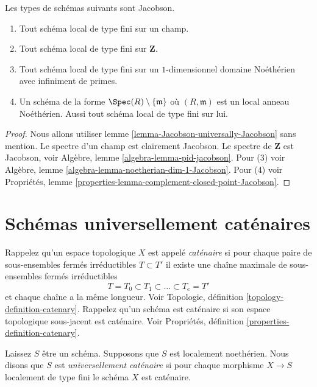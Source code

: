 \begin{lemma}

\label{lemma-ubiquity-Jacobson-schemes}
Les types de schémas suivants sont Jacobson.
\begin{enumerate}
\item Tout schéma local de type fini sur un champ.
\item Tout schéma local de type fini sur $\mathbf{Z}$.
\item Tout schéma local de type fini sur un $1$-dimensionnel domaine Noéthérien avec infiniment de primes.
\item Un schéma de la forme $\Spec(R) \setminus \{\mathfrak m\}$ où $(R, \mathfrak m)$ est un local anneau Noéthérien. Aussi tout schéma local de type fini sur lui.
\end{enumerate}

\end{lemma}

\begin{proof}
Nous allons utiliser lemme \ref{lemma-Jacobson-universally-Jacobson} sans mention. Le spectre d'un champ est clairement Jacobson. Le spectre de $\mathbf{Z}$ est Jacobson, voir Algèbre, lemme \ref{algebra-lemma-pid-jacobson}. Pour (3) voir Algèbre, lemme \ref{algebra-lemma-noetherian-dim-1-Jacobson}. Pour (4) voir Propriétés, lemme \ref{properties-lemma-complement-closed-point-Jacobson}.
\end{proof}







\section{Schémas universellement caténaires}
\label{section-universally-catenary}

\noindent
Rappelez qu'un espace topologique $X$ est appelé {\it caténaire} si pour chaque paire de sous-ensembles fermés irréductibles $T \subset T'$ il existe une chaîne maximale de sous-ensembles fermés irréductibles $$
T = T_0 \subset T_1 \subset \ldots \subset T_e = T'
$$ et chaque chaîne a la même longueur. Voir Topologie, définition \ref{topology-definition-catenary}. Rappelez qu'un schéma est caténaire si son espace topologique sous-jacent est caténaire. Voir Propriétés, définition \ref{properties-definition-catenary}.

\begin{definition}

\label{definition-universally-catenary}
Laissez $S$ être un schéma. Supposons que $S$ est localement noethérien. Nous disons que $S$ est {\it universellement caténaire} si pour chaque morphisme $X \to S$ localement de type fini le schéma $X$ est caténaire.
\end{definition}

